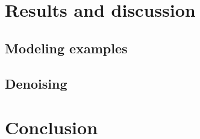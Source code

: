 \documentclass[twocolumn]{IEEEtran}
\theoremstyle{definition}
\begin{document}
%
%
%

\section{Results and discussion}
\label{sec:results}

\subsection{Modeling examples}

\subsection{Denoising}

%
%
%
%
%
\section{Conclusion}
\label{sec:conclusion}
%



\end{document}
